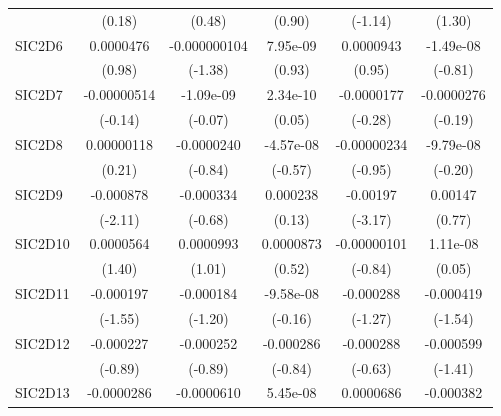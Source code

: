 \begin{table}[htbp]
\begin{tabular}{l*{5}{c}}
            &      (0.18)         &      (0.48)         &      (0.90)         &     (-1.14)         &      (1.30)         \\
SIC2D6      &   0.0000476         &-0.000000104         &    7.95e-09         &   0.0000943         &   -1.49e-08         \\
            &      (0.98)         &     (-1.38)         &      (0.93)         &      (0.95)         &     (-0.81)         \\
SIC2D7      & -0.00000514         &   -1.09e-09         &    2.34e-10         &  -0.0000177         &  -0.0000276         \\
            &     (-0.14)         &     (-0.07)         &      (0.05)         &     (-0.28)         &     (-0.19)         \\
SIC2D8      &  0.00000118         &  -0.0000240         &   -4.57e-08         & -0.00000234         &   -9.79e-08         \\
            &      (0.21)         &     (-0.84)         &     (-0.57)         &     (-0.95)         &     (-0.20)         \\
SIC2D9      &   -0.000878\sym{*}  &   -0.000334         &    0.000238         &    -0.00197\sym{**} &     0.00147         \\
            &     (-2.11)         &     (-0.68)         &      (0.13)         &     (-3.17)         &      (0.77)         \\
SIC2D10     &   0.0000564         &   0.0000993         &   0.0000873         & -0.00000101         &    1.11e-08         \\
            &      (1.40)         &      (1.01)         &      (0.52)         &     (-0.84)         &      (0.05)         \\
SIC2D11     &   -0.000197         &   -0.000184         &   -9.58e-08         &   -0.000288         &   -0.000419         \\
            &     (-1.55)         &     (-1.20)         &     (-0.16)         &     (-1.27)         &     (-1.54)         \\
SIC2D12     &   -0.000227         &   -0.000252         &   -0.000286         &   -0.000288         &   -0.000599         \\
            &     (-0.89)         &     (-0.89)         &     (-0.84)         &     (-0.63)         &     (-1.41)         \\
SIC2D13     &  -0.0000286         &  -0.0000610         &    5.45e-08         &   0.0000686         &   -0.000382         \\

\end{tabular}
\end{table}
